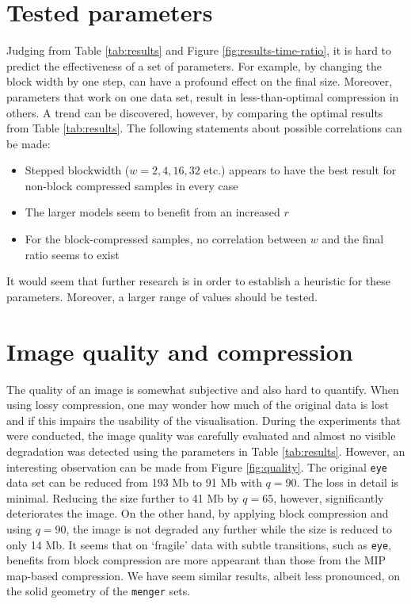 \section{Tested parameters}
%
Judging from Table \ref{tab:results} and Figure \ref{fig:results-time-ratio}, it is hard to predict the effectiveness of a set of parameters. For example, by changing the block width by one step, can have a profound effect on the final size. Moreover, parameters that work on one data set, result in less-than-optimal compression in others. A trend can be discovered, however, by comparing the optimal results from Table \ref{tab:results}. The following statements about possible correlations can be made:
\begin{itemize}
\item Stepped blockwidth ($w=2,4,16,32$ etc.) appears to have the best result for non-block compressed samples in every case
\item The larger models seem to benefit from an increased $r$
\item For the block-compressed samples, no correlation between $w$ and the final ratio seems to exist
\end{itemize}
It would seem that further research is in order to establish a heuristic for these parameters. Moreover, a larger range of values should be tested.
%
\section{Image quality and compression}
%
The quality of an image is somewhat subjective and also hard to quantify. When using lossy compression, one may wonder how much of the original data is lost and if this impairs the usability of the visualisation. During the experiments that were conducted, the image quality was carefully evaluated and almost no visible degradation was detected using the parameters in Table \ref{tab:results}. However, an interesting observation can be made from Figure \ref{fig:quality}. The original \texttt{eye} data set can be reduced from 193 Mb to 91 Mb with $q=90$. The loss in detail is minimal. Reducing the size further to 41 Mb by $q=65$, however, significantly deteriorates the image. On the other hand, by applying block compression and using $q=90$, the image is not degraded any further while the size is reduced to only 14 Mb. It seems that on `fragile' data with subtle transitions, such as \texttt{eye}, benefits from block compression are more appearant than those from the MIP map-based compression. We have seem similar results, albeit less pronounced, on the solid geometry of the \texttt{menger} sets.
%
